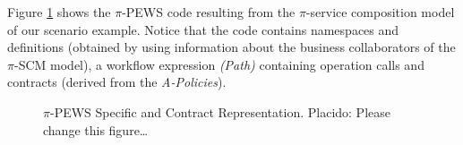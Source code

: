\begin{example}\label{ex:toPublicMusic5}
Figure \ref{fig:Specific-Contract-Representation} shows the $\pi$-PEWS code resulting from the $\pi$-service composition model of our scenario example.
Notice that the code contains namespaces and definitions (obtained by using information about the business collaborators of the $\pi$-SCM model), a workflow expression \textit{(Path)} containing operation calls and contracts (derived from the \textit{A-Policies}).
\end{example}

\begin{figure}
\caption{$\pi$-PEWS Specific and Contract Representation. {\color{red}\sc Placido: Please change this figure\dots}}
\label{fig:Specific-Contract-Representation}
\end{figure}

